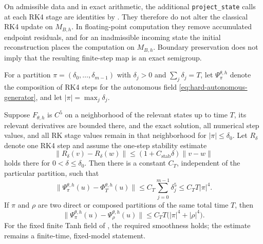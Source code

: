 \begin{remark}\label{rem:rk-reconstruction-role}
On admissible data and in exact arithmetic, the additional \texttt{project\_state} calls at each RK4 stage are identities by .  They therefore do not alter the classical RK4 update on $M_{B,h}$.  In floating-point computation they remove accumulated endpoint residuals, and for an inadmissible incoming state the initial reconstruction places the computation on $M_{B,h}$.  Boundary preservation does not imply that the resulting finite-step map is an exact semigroup.
\end{remark}

For a partition $\pi=(\delta_0,\ldots,\delta_{m-1})$ with $\delta_j>0$ and $\sum_j\delta_j=T$, let $\Psi_{\pi}^{\theta,h}$ denote the composition of RK4 steps for the autonomous field \eqref{eq:hard-autonomous-generator}, and let $|\pi|=\max_j\delta_j$.

\begin{theorem}\label{thm:rk4-composition-defect}
Suppose $F_{\theta,h}$ is $C^5$ on a neighborhood of the relevant states up to time $T$, its relevant derivatives are bounded there, and the exact solution, all numerical step values, and all RK stage values remain in that neighborhood for $|\pi|\leq\delta_0$.  Let $R_\delta$ denote one RK4 step and assume the one-step stability estimate
\begin{equation}\label{eq:rk4-one-step-stability}
\lVert R_\delta(v)-R_\delta(w)\rVert\leq(1+C_{\mathrm{stab}}\delta)\lVert v-w\rVert
\end{equation}
holds there for $0<\delta\leq\delta_0$.  Then there is a constant $C_T$, independent of the particular partition, such that
\begin{equation}\label{eq:rk4-nonuniform-global-error}
\lVert\Psi_{\pi}^{\theta,h}(u)-\Phi_T^{\theta,h}(u)\rVert\leq C_T\sum_{j=0}^{m-1}\delta_j^5\leq C_TT|\pi|^4.
\end{equation}
If $\pi$ and $\rho$ are two direct or composed partitions of the same total time $T$, then
\begin{equation}\label{eq:rk4-partition-defect}
\lVert\Psi_{\pi}^{\theta,h}(u)-\Psi_{\rho}^{\theta,h}(u)\rVert\leq C_TT\bigl(|\pi|^4+|\rho|^4\bigr).
\end{equation}
For the fixed finite Tanh field of , the required smoothness holds; the estimate remains a finite-time, fixed-model statement.
\end{theorem}

